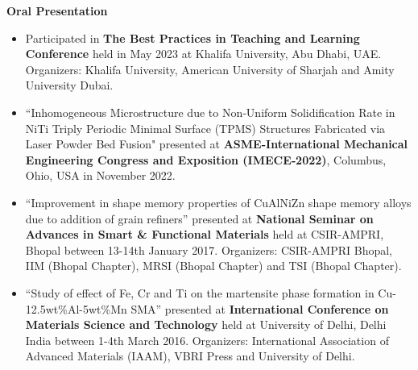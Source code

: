 






\begin{cvparagraph}

\textbf{Oral Presentation}	

    \begin{itemize}

    \item \textcolor{russell}{Participated in \textbf{The Best Practices in Teaching and Learning Conference} held in May 2023 at Khalifa University, Abu Dhabi, UAE. Organizers: Khalifa University, American University of Sharjah and Amity University Dubai.}
    \item \textcolor{russell}{“Inhomogeneous Microstructure due to Non‑Uniform Solidification Rate in NiTi Triply Periodic Minimal Surface (TPMS) Structures Fabricated via Laser Powder Bed Fusion" presented at \textbf{ASME-International Mechanical Engineering Congress and Exposition (IMECE‑2022)}, Columbus, Ohio, USA in November 2022.}
    \item \textcolor{russell}{“Improvement in shape memory properties of CuAlNiZn shape memory alloys due to addition of grain refiners” presented at \textbf{National Seminar on Advances in Smart \& Functional Materials} held at CSIR-AMPRI, Bhopal between 13-14th January 2017. Organizers: CSIR-AMPRI Bhopal, IIM (Bhopal Chapter), MRSI (Bhopal Chapter) and TSI (Bhopal Chapter).}
     \item \textcolor{russell}{“Study of effect of Fe, Cr and Ti on the martensite phase formation in Cu-12.5wt\%Al-5wt\%Mn SMA” presented at \textbf{International Conference on Materials Science and Technology} held at University of Delhi, Delhi India between 1-4th March 2016. Organizers: International Association of Advanced Materials (IAAM), VBRI Press and University of Delhi.}
    \end{itemize}
    \vspace{-2em} %
				

\end{cvparagraph}
